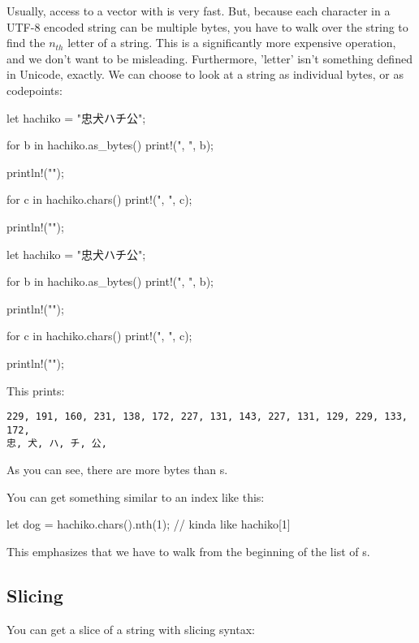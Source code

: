 Usually, access to a vector with \code{[]} is very fast. But, because each character in a UTF-8 encoded string can be multiple bytes, 
you have to walk over the string to find the $n_{th}$ letter of a string. This is a significantly more expensive operation, and we don't 
want to be misleading. Furthermore, 'letter' isn't something defined in Unicode, exactly. We can choose to look at a string as individual 
bytes, or as codepoints:

\begin{rustc}
let hachiko = "忠犬ハチ公";

for b in hachiko.as_bytes() {
    print!("{}, ", b);
}

println!("");

for c in hachiko.chars() {
    print!("{}, ", c);
}

println!("");
\end{rustc}

\begin{rustc}
let hachiko = "忠犬ハチ公";

for b in hachiko.as_bytes() {
    print!("{}, ", b);
}

println!("");

for c in hachiko.chars() {
    print!("{}, ", c);
}

println!("");
\end{rustc}

This prints:

\begin{verbatim}
229, 191, 160, 231, 138, 172, 227, 131, 143, 227, 131, 129, 229, 133, 172,
忠, 犬, ハ, チ, 公,
\end{verbatim}

As you can see, there are more bytes than \varchar s.

\blank

You can get something similar to an index like this:

\begin{rustc}
let dog = hachiko.chars().nth(1); // kinda like hachiko[1]
\end{rustc}

This emphasizes that we have to walk from the beginning of the list of \varchar s.

\subsection*{Slicing}

You can get a slice of a string with slicing syntax:

